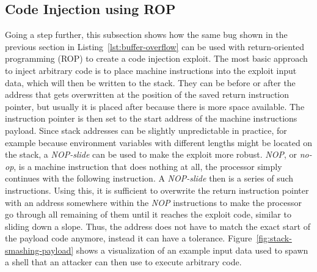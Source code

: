 
\subsection{Code Injection using ROP}\label{subsec:unsafe-security-problems:buffer-overflow:code-injection}

Going a step further, this subsection shows how the same bug shown in the previous section in
Listing~\ref{lst:buffer-overflow} can be used with return-oriented programming (\acrshort{ROP}) to create a code
injection exploit.
The most basic approach to inject arbitrary code is to place machine instructions into the exploit input data, which
will then be written to the stack.
They can be before or after the address that gets overwritten at the position of the saved return instruction pointer,
but usually it is placed after because there is more space available.
The instruction pointer is then set to the start address of the machine instructions payload.
Since stack addresses can be slightly unpredictable in practice, for example because environment variables with
different lengths might be located on the stack, a \textit{NOP-slide} can be used to make the exploit more robust.
\textit{NOP}, or \textit{no-op}, is a machine instruction that does nothing at all, the processor simply continues with
the following instruction.
A \textit{NOP-slide} then is a series of such instructions.
Using this, it is sufficient to overwrite the return instruction pointer with an address somewhere within the
\textit{NOP} instructions to make the processor go through all remaining of them until it reaches the exploit code,
similar to sliding down a slope.
Thus, the address does not have to match the exact start of the payload code anymore, instead it can have a tolerance.
Figure~\ref{fig:stack-smashing-payload} shows a visualization of an example input data used to spawn a shell that an
attacker can then use to execute arbitrary code.



